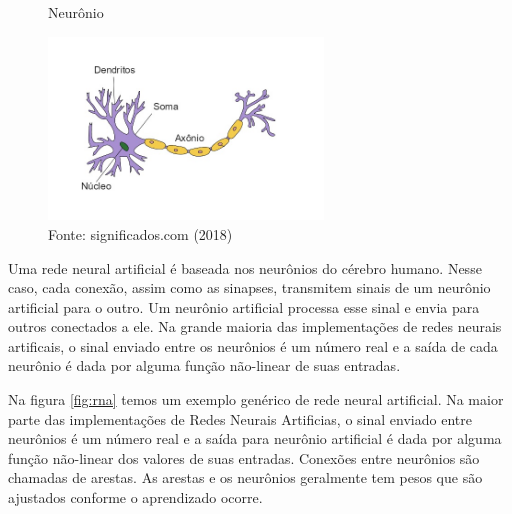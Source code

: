 \begin{figure}[!ht]
\centering 
\caption{Neurônio}
\label{fig:neuron}
\includegraphics[width=0.65\textwidth]{imgs/neuronio.jpg}
\caption*{Fonte: significados.com (2018)}
\end{figure}

Uma rede neural artificial é baseada nos neurônios do cérebro humano. Nesse caso, cada conexão, assim como as sinapses, transmitem sinais de um neurônio artificial para o outro. Um neurônio artificial processa esse sinal e envia para outros conectados a ele. Na grande maioria das implementações de redes neurais artificais, o sinal enviado entre os neurônios é um número real e a saída de cada neurônio é dada por alguma função não-linear de suas entradas.

Na figura \ref{fig:rna} temos um exemplo genérico de rede neural artificial. Na maior parte das implementações de Redes Neurais Artificias, o sinal enviado entre neurônios é um número real e a saída para neurônio artificial é dada por alguma função não-linear dos valores de suas entradas. Conexões entre neurônios são chamadas de arestas. As arestas e os neurônios geralmente tem pesos que são ajustados conforme o aprendizado ocorre. 

\def\layersep{3.5cm}

